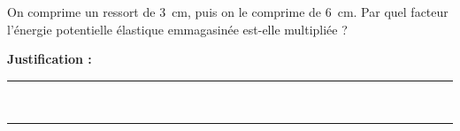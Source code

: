 On comprime un ressort de \qty{3}{cm}, puis on le comprime de \qty{6}{cm}. Par quel facteur l'énergie potentielle élastique emmagasinée est-elle multipliée ?

\choices

\noindent\textbf{Justification :} \hrulefill \\[2.5ex]
\rule{\linewidth}{0.4pt} \\[2.5ex]
\rule{\linewidth}{0.4pt}
\vfill
